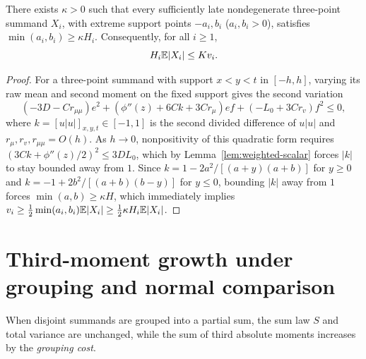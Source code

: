\begin{lemma}\label{lem:weighted-shape}
There exists $\kappa>0$ such that every sufficiently late nondegenerate
three-point summand $X_i$, with extreme support points $-a_i,b_i$ ($a_i,b_i>0$),
satisfies $\min(a_i,b_i)\ge\kappa H_i$. Consequently, for all $i\ge1$,
\begin{equation}\label{eq:weighted-shape-bound}
                         H_i\mathbb E|X_i|\le K v_i.
\end{equation}
\end{lemma}
\begin{proof}
For a three-point summand with support $x<y<t$ in $[-h,h]$, varying its raw
mean and second moment on the fixed support gives the second variation
\[
 (-3D-Cr_{\mu\mu})e^2+
   (\phi''(z)+6Ck+3Cr_\mu)ef+
   (-L_0+3Cr_v)f^2\le0,
\]
where $k=[u|u|]_{x,y,t}\in[-1,1]$ is the second divided difference of $u|u|$
and $r_{\mu},r_v,r_{\mu\mu}=O(h)$. As $h\to0$, nonpositivity of this
quadratic form requires $(3Ck+\phi''(z)/2)^2\le3DL_0$, which by
Lemma~\ref{lem:weighted-scalar} forces $|k|$ to stay bounded away from $1$.
Since $k=1-2a^2/[(a+y)(a+b)]$ for $y\ge0$ and $k=-1+2b^2/[(a+b)(b-y)]$ for
$y\le0$, bounding $|k|$ away from $1$ forces $\min(a,b)\ge\kappa H$, which
immediately implies $v_i\ge\frac12\min(a_i,b_i)\mathbb E|X_i|\ge\frac12\kappa H_i\mathbb E|X_i|$.
\end{proof}

\section{Third-moment growth under grouping and normal comparison}
\label{sec:weighted-grouping}

When disjoint summands are grouped into a partial sum, the sum law $S$ and
total variance are unchanged, while the sum of third absolute moments
increases by the \emph{grouping cost}.

